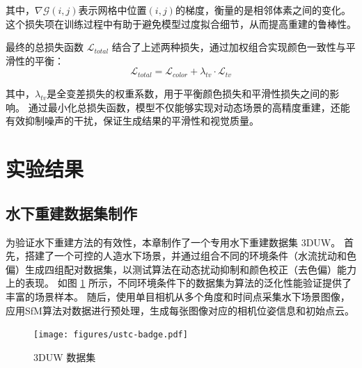 其中，$\nabla \mathcal{G}(i,j)$表示网格中位置$(i,j)$的梯度，衡量的是相邻体素之间的变化。这个损失项在训练过程中有助于避免模型过度拟合细节，从而提高重建的鲁棒性。

最终的总损失函数 $\mathcal{L}_{total}$ 结合了上述两种损失，通过加权组合实现颜色一致性与平滑性的平衡：
$$
\mathcal{L}_{total} = \mathcal{L}_{color} + \lambda_{tv} \cdot \mathcal{L}_{tv}
$$

其中，$\lambda_{tv}$是全变差损失的权重系数，用于平衡颜色损失和平滑性损失之间的影响。
通过最小化总损失函数，模型不仅能够实现对动态场景的高精度重建，还能有效抑制噪声的干扰，保证生成结果的平滑性和视觉质量。

\section{实验结果}
\subsection{水下重建数据集制作}
为验证水下重建方法的有效性，本章制作了一个专用水下重建数据集 3DUW。
首先，搭建了一个可控的人造水下场景，并通过组合不同的环境条件（水流扰动和色偏）生成四组配对数据集，以测试算法在动态扰动抑制和颜色校正（去色偏）能力上的表现。
如图 \ref{img:3DUW} 所示，不同环境条件下的数据集为算法的泛化性能验证提供了丰富的场景样本。
随后，使用单目相机从多个角度和时间点采集水下场景图像，应用SfM算法\cite{sfm1}\cite{sfm2}对数据进行预处理，生成每张图像对应的相机位姿信息和初始点云。
\begin{figure}
    \centering
    \texttt{[image: figures/ustc-badge.pdf]}
    \caption{3DUW 数据集}
    \label{img:3DUW}
\end{figure}

